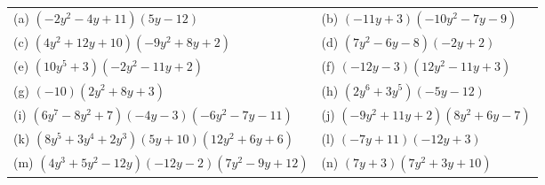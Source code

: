           \begin{table}[H]
        \begin{center}
      \label{m39387*id273574}
    \noindent
      \tablelasttail{}
      \begin{xtabular}[t]{|l|l|}\hline
        (a) $\left(-2{y}^{2}-4y+11\right)\left(5y-12\right)$ &
        (b) $\left(-11y+3\right)\left(-10{y}^{2}-7y-9\right)$%
     \tabularnewline{}
        (c) $\left(4{y}^{2}+12y+10\right)\left(-9{y}^{2}+8y+2\right)$ &
        (d) $\left(7{y}^{2}-6y-8\right)\left(-2y+2\right)$%
     \tabularnewline{}
        (e) $\left(10{y}^{5}+3\right)\left(-2{y}^{2}-11y+2\right)$ &
        (f) $\left(-12y-3\right)\left(12{y}^{2}-11y+3\right)$%
     \tabularnewline{}
        (g) $\left(-10\right)\left(2{y}^{2}+8y+3\right)$ &
        (h) $\left(2{y}^{6}+3{y}^{5}\right)\left(-5y-12\right)$%
     \tabularnewline{}
        (i) $\left(6{y}^{7}-8{y}^{2}+7\right)\left(-4y-3\right)\left(-6{y}^{2}-7y-11\right)$ &
        (j) $\left(-9{y}^{2}+11y+2\right)\left(8{y}^{2}+6y-7\right)$%
     \tabularnewline{}
        (k) $\left(8{y}^{5}+3{y}^{4}+2{y}^{3}\right)\left(5y+10\right)\left(12{y}^{2}+6y+6\right)$ &
        (l) $\left(-7y+11\right)\left(-12y+3\right)$%
     \tabularnewline{}
        (m) $\left(4{y}^{3}+5{y}^{2}-12y\right)\left(-12y-2\right)\left(7{y}^{2}-9y+12\right)$ &
        (n) $\left(7y+3\right)\left(7{y}^{2}+3y+10\right)$%
     \tabularnewline{}

\end{xtabular}
\end{center}
\end{table}
